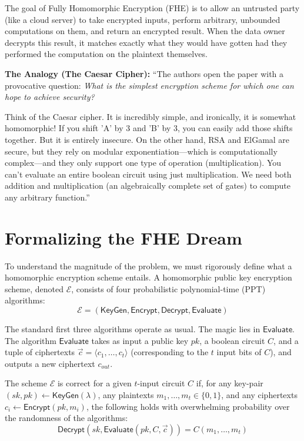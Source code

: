 The goal of Fully Homomorphic Encryption (FHE) is to allow an untrusted party (like a cloud server) to take encrypted inputs, perform arbitrary, unbounded computations on them, and return an encrypted result. When the data owner decrypts this result, it matches exactly what they would have gotten had they performed the computation on the plaintext themselves.

\begin{speakernote}
\textbf{The Analogy (The Caesar Cipher):}
``The authors open the paper with a provocative question: \textit{What is the simplest encryption scheme for which one can hope to achieve security?} 

Think of the Caesar cipher. It is incredibly simple, and ironically, it is somewhat homomorphic! If you shift 'A' by 3 and 'B' by 3, you can easily add those shifts together. But it is entirely insecure. On the other hand, RSA and ElGamal are secure, but they rely on modular exponentiation—which is computationally complex—and they only support one type of operation (multiplication). You can't evaluate an entire boolean circuit using just multiplication. We need both addition and multiplication (an algebraically complete set of gates) to compute any arbitrary function.''
\end{speakernote}

\section{Formalizing the FHE Dream}

To understand the magnitude of the problem, we must rigorously define what a homomorphic encryption scheme entails. A homomorphic public key encryption scheme, denoted $\mathcal{E}$, consists of four probabilistic polynomial-time (PPT) algorithms: 
\begin{equation}
    \mathcal{E} = (\mathsf{KeyGen}, \mathsf{Encrypt}, \mathsf{Decrypt}, \mathsf{Evaluate})
\end{equation}

The standard first three algorithms operate as usual. The magic lies in $\mathsf{Evaluate}$. The algorithm $\mathsf{Evaluate}$ takes as input a public key $pk$, a boolean circuit $C$, and a tuple of ciphertexts $\vec{c} = \langle c_1, \dots, c_t \rangle$ (corresponding to the $t$ input bits of $C$), and outputs a new ciphertext $c_{out}$.

\begin{definition}
The scheme $\mathcal{E}$ is correct for a given $t$-input circuit $C$ if, for any key-pair $(sk, pk) \leftarrow \mathsf{KeyGen}(\lambda)$, any plaintexts $m_1, \dots, m_t \in \{0, 1\}$, and any ciphertexts $c_i \leftarrow \mathsf{Encrypt}(pk, m_i)$, the following holds with overwhelming probability over the randomness of the algorithms:
\begin{equation}
    \mathsf{Decrypt}(sk, \mathsf{Evaluate}(pk, C, \vec{c})) = C(m_1, \dots, m_t)
\end{equation}
\end{definition}

